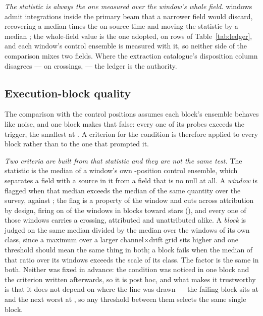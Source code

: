 \emph{The statistic is always the one measured over the window's whole field.}
\StNRep{} windows admit integrations inside the primary beam that a narrower
field would discard, recovering a median \StRepOnsrc{} times the on-source
time and moving the statistic by a median \StRepDT; the whole-field value is
the one adopted, on \StRepAdopted{} rows of Table~\ref{tab:ledger}, and each
window's control ensemble is measured with it, so neither side of the
comparison mixes two fields. Where the extraction catalogue's disposition
column disagrees --- on \StRepFell{} crossings, \StRepAttrClause{} --- the
ledger is the authority.

\subsection{Execution-block quality}
\label{sec:blockquality}

The comparison with the control positions assumes each block's ensemble
behaves like noise, and one block makes that false: every one of its \NCtrl{}
probes exceeds the trigger, the smallest at \BqFailCtrlMin. A criterion for
the condition is therefore applied to every block rather than to the one that
prompted it.

\emph{Two criteria are built from that statistic and they are not the same
test.} The statistic is the median of a window's own \NCtrl-position control
ensemble, which separates a field with a source in it from a field that is no
null at all. A \emph{window} is flagged when that median exceeds \BqFactor{}
the median of the same quantity over the survey, \DqThresh{} against
\DqSurvMed; the flag is a property of the window and cuts across attribution
by design, firing on \DqNWin{} of the \NWindows{} windows in
\BkFlagNBlock{} blocks toward \DqNStar{} stars (\DqStars), and every one of
those windows carries a crossing, attributed and unattributed alike. A
\emph{block} is judged on the same median divided by the median over the
windows of its own class, since a maximum over a larger
channel$\times$drift grid sits higher and one threshold should mean the same
thing in both; a block fails when the median of that ratio over its windows
exceeds \BqFactor{} the scale of its class. The factor is the same in
both. Neither was fixed in advance: the condition
was noticed in one block and the criterion written afterwards, so it is post
hoc, and what makes it trustworthy is that it does not depend on where the
line was drawn --- the failing block sits at \BqFailQ{} and the next worst at
\BqNextQ, so any threshold between them selects the same single block.

